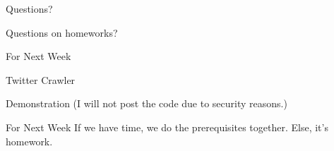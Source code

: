 \documentclass{beamer}
\begin{document}
\begin{frame}{Questions?}
\end{frame}

\begin{frame}{Questions on homeworks?}
\end{frame}

\begin{frame}{For Next Week}
  \begin{center}
    Twitter Crawler
  \end{center}
\end{frame}

\begin{frame}{Demonstration}
  (I will not post the code due to security reasons.)
\end{frame}

\begin{frame}{For Next Week}
  If we have time, we do the prerequisites together.
  Else, it's homework.
\end{frame}
\end{document}
